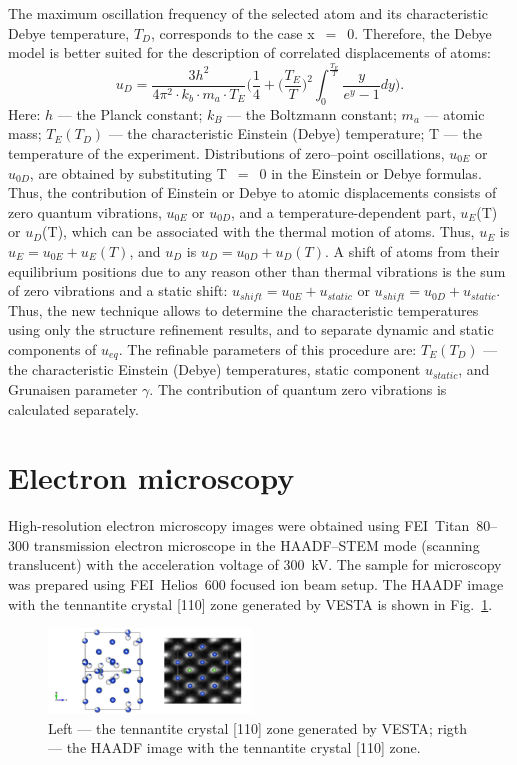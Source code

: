 \documentclass[preprint,review,12pt]{elsarticle}
\begin{document}
The maximum oscillation frequency of the selected atom and its characteristic Debye temperature, $T_{D}$, corresponds to the case x~$=$~0. Therefore, the Debye model is better suited for the description of correlated displacements of atoms:
\[
u_{D}=\frac{3h^2}{4\pi^2\cdot k_{b} \cdot m_{a} \cdot T_{E}} \bigg(\frac{1}{4} + \Big(\frac{T_{E}}{T}\Big)^2 \int_{0}^{\frac{T_{E}}{T}} \frac{y}{e^{y} - 1}dy \bigg).
\]
Here: $h$ --- the Planck constant; $k_{B}$ --- the Boltzmann constant; $m_{a}$ --- atomic mass; $T_{E}(T_{D})$ --- the characteristic Einstein (Debye) temperature; T --- the temperature of the experiment. Distributions of zero--point oscillations, $u_{0E}$ or $u_{0D}$, are obtained by substituting T~$=$~0 in the Einstein or Debye formulas. Thus, the contribution of Einstein or Debye to atomic displacements consists of zero quantum vibrations, $u_{0E}$ or $u_{0D}$, and a temperature-dependent part, $u_{E}$(T) or $u_{D}$(T), which can be associated with the thermal motion of atoms. Thus, $u_{E}$ is $u_{E}=u_{0E}+u_{E}(T)$, and $u_{D}$ is $u_{D}=u_{0D}+u_{D}(T)$.
A shift of atoms from their equilibrium positions due to any reason other than thermal vibrations is the sum of zero vibrations and a static shift:
$u_{shift}=u_{0E}+u_{static}$ or $u_{shift}=u_{0D}+u_{static}$.
Thus, the new technique allows to determine the characteristic temperatures using only the structure refinement results, and to separate dynamic and static components of $u_{eq}$.
The refinable parameters of this procedure are: $T_{E}(T_{D})$ --- the characteristic Einstein (Debye) temperatures, static component $u_{static}$, and Grunaisen parameter $\gamma$. The contribution of quantum zero vibrations is calculated separately.


\section{Electron microscopy}\label{sec:level1}
High-resolution electron microscopy images were obtained using FEI~Titan~80--300 transmission electron microscope in the HAADF--STEM mode (scanning translucent) with the acceleration voltage of 300~kV.
The sample for microscopy was prepared using FEI~Helios~600 focused ion beam setup.
The HAADF image with the tennantite crystal [110]  zone generated by VESTA\cite{Momma2011} is shown in Fig.~\ref{fig:haadf_overlay}.

\begin{figure}
\centering
\includegraphics[width=0.48\textwidth]{mic_cu12as4s13_110}%
\caption{\label{fig:haadf_overlay} Left --- the tennantite crystal [110] zone  generated  by VESTA\cite{Momma2011}; rigth --- the HAADF image with the tennantite crystal [110] zone.}
\end{figure}
\end{document}

